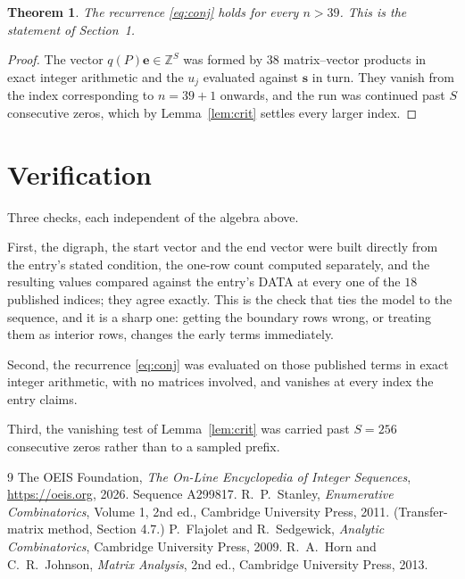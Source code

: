 \documentclass[11pt,a4paper]{article}
\theoremstyle{plain}
\newtheorem{theorem}{Theorem}
\theoremstyle{definition}
\begin{document}
\begin{theorem}
The recurrence \eqref{eq:conj} holds for every $n>39$. This is the statement of
Section~1.
\end{theorem}

\begin{proof}
The vector $q(P)\mathbf{e}\in\mathbb{Z}^{S}$ was formed by $38$ matrix--vector
products in exact integer arithmetic and the $u_j$ evaluated against $\mathbf{s}$ in turn.
They vanish from the index corresponding to $n=39+1$ onwards, and the run was continued
past $S$ consecutive zeros, which by Lemma~\ref{lem:crit} settles every larger index.
\end{proof}

\section{Verification}

Three checks, each independent of the algebra above.

First, the digraph, the start vector and the end vector were built directly from the
entry's stated condition, the one-row count computed separately, and the resulting values
compared against the entry's DATA at every one of the $18$ published indices; they
agree exactly. This is the check that ties the model to the sequence, and it is a sharp one:
getting the boundary rows wrong, or treating them as interior rows, changes the early terms
immediately.

Second, the recurrence \eqref{eq:conj} was evaluated on those published terms in exact
integer arithmetic, with no matrices involved, and vanishes at every index the entry claims.

Third, the vanishing test of Lemma~\ref{lem:crit} was carried past $S=256$ consecutive
zeros rather than to a sampled prefix.

\begin{thebibliography}{9}
 The OEIS Foundation, \emph{The On-Line Encyclopedia of Integer
Sequences}, \url{https://oeis.org}, 2026. Sequence A299817.
 R.~P.~Stanley, \emph{Enumerative Combinatorics}, Volume 1, 2nd ed.,
Cambridge University Press, 2011. (Transfer-matrix method, Section 4.7.)
 P.~Flajolet and R.~Sedgewick, \emph{Analytic Combinatorics}, Cambridge
University Press, 2009.
 R.~A.~Horn and C.~R.~Johnson, \emph{Matrix Analysis}, 2nd ed., Cambridge
University Press, 2013.
\end{thebibliography}
\end{document}
